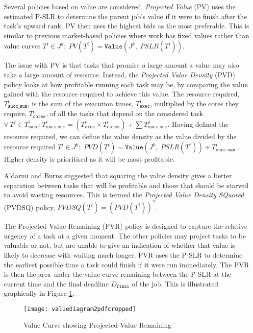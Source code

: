 \documentclass[english,british]{IEEEtran}
\begin{document}
Several policies based on value are considered. \emph{Projected Value}
(PV) uses the estimated P-SLR to determine the parent job's value
if it were to finish after the task's upward rank. PV then uses the
highest bids as the most preferable. This is similar to previous market-based
policies where work has fixed values rather than value curves $T^{i}\in J^{k}:\;PV\left(T^{i}\right)=\mathtt{Value}\left(J^{k},\;PSLR\left(T^{i}\right)\right)$.

The issue with PV is that tasks that promise a large amount a value
may also take a large amount of resource. Instead, the \emph{Projected
Value Density} (PVD) policy \cite{Locke1986} looks at how profitable
running each task may be, by comparing the value gained with the resource
required to achieve this value. The resource required, $T_{\mathtt{succ\_sum}}^{i}$,
is the sum of the execution times, $T_{\mathtt{exec}}^{i}$, multiplied
by the cores they require, $T_{\mathtt{cores}}^{i}$, of all the tasks
that depend on the considered task $\forall\,T^{j}\in T_{\mathtt{succ}}^{i}:T_{\mathtt{succ\_sum}}^{i}=\left(T_{\mathtt{exec}}^{i}\times T_{\mathtt{cores}}^{i}\right)+\sum T_{\mathtt{succ\_sum}}^{j}$.
Having defined the resource required, we can define the value density
as the value divided by the resource required $T^{i}\in J^{k}:\;PVD\left(T^{i}\right)=\mathtt{Value}\left(J^{k},\;PSLR\left(T^{i}\right)\right)\div T_{\mathtt{succ\_sum}}^{i}$
. Higher density is prioritised as it will be most profitable.

Aldarmi and Burns \cite{aldarmi1999} suggested that squaring the
value density gives a better separation between tasks that will be
profitable and those that should be starved to avoid wasting resources.
This is termed the \emph{Projected Value Density SQuared} (PVDSQ)
policy, $PVDSQ\left(T^{i}\right)=\left(PVD\left(T^{i}\right)\right)^{2}$.

The Projected Value Remaining (PVR) policy \cite{aburkimsherEngD14}
is designed to capture the relative urgency of a task at a given moment.
The other policies may project tasks to be valuable or not, but are
unable to give an indication of whether that value is likely to decrease
with waiting much longer. PVR uses the P-SLR to determine the earliest
possible time a task could finish if it were run immediately. The
PVR is then the area under the value curve remaining between the P-SLR
at the current time and the final deadline $D_{\mathtt{final}}$ of
the job. This is illustrated graphically in Figure \ref{fig:pvr-diag}.

\begin{figure}
\noindent \begin{centering}
\texttt{[image: valuediagram2pdfcropped]}
\par\end{centering}

\protect\caption{Value Curve showing Projected Value Remaining }


\label{fig:pvr-diag}
\end{figure}
\end{document}
